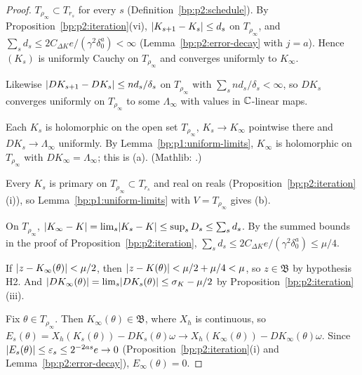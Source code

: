 \begin{proof}
\label{step:p2:lim-k}
$T_{\rho_\infty}\subset T_{r_s}$ for every $s$ (Definition~\ref{bp:p2:schedule}). By
Proposition~\ref{bp:p2:iteration}(vi), $\lvert K_{s+1}-K_s\rvert\le d_s$ on $T_{\rho_\infty}$, and
$\sum_sd_s\le2C_{\Delta K}e/(\gamma^2\delta_0^a)<\infty$ (Lemma~\ref{bp:p2:error-decay} with $j=a$).
Hence $(K_s)$ is uniformly Cauchy on $T_{\rho_\infty}$ and converges uniformly to $K_\infty$.

\label{step:p2:lim-dk}
Likewise $\lvert DK_{s+1}-DK_s\rvert\le nd_s/\delta_s$ on $T_{\rho_\infty}$ with $\sum_snd_s/\delta_s<\infty$, so
$DK_s$ converges uniformly on $T_{\rho_\infty}$ to some $\Lambda_\infty$ with values in $\mathbb{C}$-linear maps.

\label{step:p2:lim-holo}
Each $K_s$ is holomorphic on the open set $T_{\rho_\infty}$, $K_s\to K_\infty$ pointwise there and
$DK_s\to\Lambda_\infty$ uniformly. By Lemma~\ref{bp:p1:uniform-limits}, $K_\infty$ is holomorphic on
$T_{\rho_\infty}$ with $DK_\infty=\Lambda_\infty$; this is (a). (Mathlib:
.)

\label{step:p2:lim-primary}
Every $K_s$ is primary on $T_{\rho_\infty}\subset T_{r_s}$ and real on reals
(Proposition~\ref{bp:p2:iteration}(i)), so Lemma~\ref{bp:p1:uniform-limits} with $V=T_{\rho_\infty}$ gives (b).

\label{step:p2:lim-close}
On $T_{\rho_\infty}$, $\lvert K_\infty-K\rvert=\lim_s\lvert K_s-K\rvert\le\sup_sD_s\le\sum_sd_s$. By the summed bounds
in the proof of Proposition~\ref{bp:p2:iteration}, $\sum_sd_s\le2C_{\Delta K}e/(\gamma^2\delta_0^a)\le
\mu/4$.

\label{step:p2:lim-margins}
If $\lvert z-K_\infty(\theta)\rvert<\mu/2$, then $\lvert z-K(\theta)\rvert<\mu/2+\mu/4<\mu$, so $z\in\mathfrak B$ by
hypothesis H2. And $\lvert DK_\infty(\theta)\rvert=\lim_s\lvert DK_s(\theta)\rvert\le\sigma_K-\mu/2$ by
Proposition~\ref{bp:p2:iteration}(iii).

\label{step:p2:lim-invariance}
Fix $\theta\in T_{\rho_\infty}$. Then $K_\infty(\theta)\in\mathfrak B$, where $X_h$ is continuous, so
$E_s(\theta)=X_h(K_s(\theta))-DK_s(\theta)\omega\to X_h(K_\infty(\theta))-DK_\infty(\theta)\omega$. Since
$\lvert E_s(\theta)\rvert\le\varepsilon_s\le2^{-2as}e\to0$ (Proposition~\ref{bp:p2:iteration}(i) and
Lemma~\ref{bp:p2:error-decay}), $E_\infty(\theta)=0$.
\end{proof}

